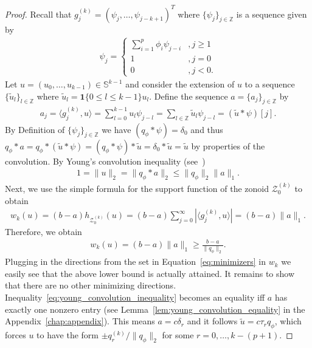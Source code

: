 \begin{proof}
    Recall that $g_j^{(k)}=(\psi_j,\dots,\psi_{j-k+1})^{T}$ where $\{\psi_{j}\}_{j\in\mathbb{Z}}$ is a sequence given by
    \begin{align*}
        \psi_j=\begin{cases}
            \sum_{i=1}^{p}\phi_i\psi_{j-i} & ,j\ge 1\\
            1 & ,j=0\\
            0 & ,j<0.
        \end{cases}
    \end{align*}
    Let $u=(u_0,\dots,u_{k-1})\in\mathbb{S}^{k-1}$ and consider the extension of $u$ to a sequence $\{\tilde{u}_l\}_{l\in\mathbb{Z}}$ where $\tilde{u}_l=\mathbf{1}\{0\le l\le k-1\}u_l$. Define the sequence $a=\{a_j\}_{j\in\mathbb{Z}}$ by
    \begin{align*}
        a_j=\langle g_j^{(k)},u\rangle=\sum_{l=0}^{k-1}u_l\psi_{j-l}=\sum_{l\in\mathbb{Z}}\tilde{u}_l\psi_{j-l}=(\tilde{u}\ast\psi)[j].
    \end{align*}
    By Definition of $\{\psi_j\}_{j\in\mathbb{Z}}$ we have $(q_{\phi}\ast\psi)=\delta_0$ and thus $q_{\phi}\ast a=q_{\phi}\ast(\tilde{u}\ast\psi)=(q_{\phi}\ast\psi)\ast\tilde{u}=\delta_0\ast\tilde{u}=\tilde{u}$ by properties of the convolution. By Young's convolution inequality (see~\cite[Theorem 1.2.12]{grafakos_classical_2014})
    \begin{align}\label{eq:young_convolution_inequality}
        1=\|u\|_2=\|q_{\phi}\ast a\|_2\le\|q_{\phi}\|_2\|a\|_1.
    \end{align}
    Next, we use the simple formula for the support function of the zonoid $\mathcal{Z}^{(k)}_0$ to obtain
    \begin{align*}
        w_k(u)=(b-a)h_{\mathcal{Z}^{(k)}_0}(u)=(b-a)\sum_{j=0}^{\infty}|\langle g_j^{(k)},u\rangle|=(b-a)\|a\|_1.
    \end{align*}
    Therefore, we obtain
    \begin{align*}
        w_k(u)=(b-a)\|a\|_1\ge\frac{b-a}{\|q_{\phi}\|_2}.
    \end{align*}
    Plugging in the directions from the set in Equation~\eqref{eq:minimizers} in $w_k$ we easily see that the above lower bound is actually attained. It remains to show that there are no other minimizing directions. Inequality~\eqref{eq:young_convolution_inequality} becomes an equality iff $a$ has exactly one nonzero entry (see Lemma~\ref{lem:young_convolution_equality} in the Appendix~\ref{chap:appendix}). This means $a=c\delta_r$ and it follows $\tilde{u}=c\tau_rq_{\phi}$, which forces $u$ to have the form $\pm q_r^{(k)}/\|q_{\phi}\|_2$ for some $r=0,\dots,k-(p+1)$.


\end{proof}
